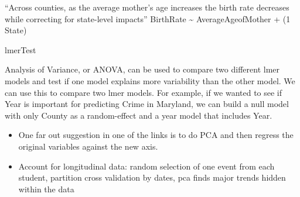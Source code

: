 \documentclass[]{book}
\theoremstyle{definition}
\theoremstyle{definition}
\theoremstyle{definition}
\theoremstyle{remark}
\begin{document}
``Across counties, as the average mother's age increases the birth rate
decreases while correcting for state-level impacts'' BirthRate
\textasciitilde{} AverageAgeofMother + (1 \textbar{} State)

lmerTest

Analysis of Variance, or ANOVA, can be used to compare two different
lmer models and test if one model explains more variability than the
other model. We can use this to compare two lmer models. For example, if
we wanted to see if Year is important for predicting Crime in Maryland,
we can build a null model with only County as a random-effect and a year
model that includes Year.

\begin{itemize}
\item
  One far out suggestion in one of the links is to do PCA and then
  regress the original variables against the new axis.
\item
  Account for longitudinal data: random selection of one event from each
  student, partition cross validation by dates, pca finds major trends
  hidden within the data
\end{itemize}


\end{document}
